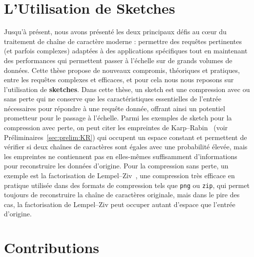 \section*{L'Utilisation de Sketches}

Jusqu'à présent, nous avons présenté les deux principaux défis au cœur du traitement de chaîne de caractère moderne : permettre des requêtes pertinentes (et parfois complexes) adaptées à des applications spécifiques tout en maintenant des performances qui permettent passer à l'échelle sur de grands volumes de données.
%
Cette thèse propose de nouveaux compromis, théoriques et pratiques, entre les requêtes complexes et efficaces, et pour cela nous nous reposons sur l'utilisation de \textbf{sketches}.
%
Dans cette thèse, un sketch est une compression avec ou sans perte qui ne conserve que les caractéristiques essentielles de l'entrée nécessaires pour répondre à une requête donnée, offrant ainsi un potentiel prometteur pour le passage à l'échelle. 
Parmi les exemples de sketch pour la compression avec perte, on peut citer les empreintes de Karp--Rabin~\cite{KRfingerprint} (voir Préliminaires~\ref{sec:prelim:KR}) qui occupent un espace constant et permettent de vérifier si deux chaînes de caractères sont égales avec une probabilité élevée, mais les empreintes ne contiennent pas en elles-mêmes suffisamment d'informations pour reconstruire les données d'origine.
Pour la compression sans perte, un exemple est la factorisation de Lempel--Ziv~\cite{ziv1977universal}, une compression très efficace en pratique utilisée dans des formats de compression tels que \texttt{png} ou \texttt{zip}, qui permet toujours de reconstruire la chaîne de caractères originale, mais dans le pire des cas, la factorisation de Lempel--Ziv peut occuper autant d'espace que l'entrée d'origine.

\section*{Contributions}

